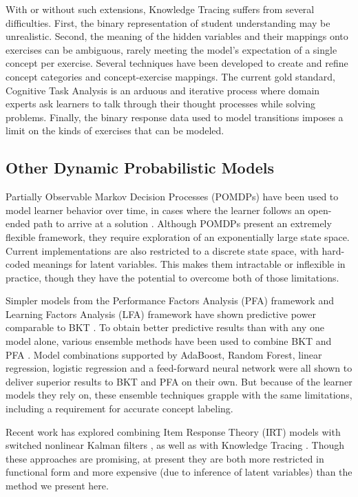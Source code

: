 \documentclass{article} \usepackage{nips,times}
\begin{document}
With or without such extensions, Knowledge Tracing suffers from several difficulties. First, the binary representation of student understanding may be unrealistic. Second, the meaning of the hidden variables and their mappings onto exercises can be ambiguous, rarely meeting the model's expectation of a single concept per exercise.
Several techniques have been developed to create and refine concept categories and concept-exercise mappings. The current gold standard, Cognitive Task Analysis \cite{schraagen2000cognitive} is an arduous and iterative process where domain experts ask learners to talk through their thought processes while solving problems.
Finally, the binary response data used to model transitions imposes a limit on the kinds of exercises that can be modeled.

\subsection{Other Dynamic Probabilistic Models}

Partially Observable Markov Decision Processes (POMDPs) have been used to model learner behavior over time, in cases where the learner follows an open-ended path to arrive at a solution \cite{rafferty2011faster}. Although POMDPs present an extremely flexible framework, they require exploration of an exponentially large state space. Current implementations are also restricted to a discrete state space, with hard-coded meanings for latent variables. This makes them intractable or inflexible in practice, though they have the potential to overcome both of those limitations.

Simpler models from the Performance Factors Analysis (PFA) framework \cite{pavlik2009performance} and Learning Factors Analysis (LFA) framework \cite{cen2006learning} have shown predictive power comparable to BKT \cite{gong2010comparing}. 
To obtain better predictive results than with any one model alone, various ensemble methods have been used to combine BKT and PFA \cite{d2011ensembling}. Model combinations supported by AdaBoost, Random Forest, linear regression, logistic regression and a feed-forward neural network were all shown to deliver superior results to BKT and PFA on their own. But because of the learner models they rely on, these ensemble techniques grapple with the same limitations, including a requirement for accurate concept labeling.

Recent work has explored combining Item Response Theory (IRT) models with switched nonlinear Kalman filters \cite{lan2014time}, as well as with Knowledge Tracing \cite{khajah2014integrating,khajah2014incorporating}. Though these approaches are promising, at present they are both more restricted in functional form and more expensive (due to inference of latent variables) than the method we present here.
\end{document}
